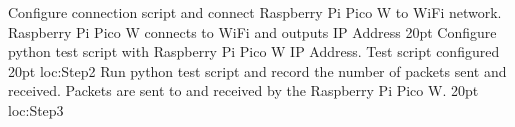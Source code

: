 {%
%
%
%
\tpStep%
{Configure connection script and connect Raspberry Pi Pico W to WiFi network.}
{Raspberry Pi Pico W connects to WiFi and outputs IP Address}
{20pt}
%
\tpStepLabeled%
{Configure python test script with Raspberry Pi Pico W IP Address.}
{Test script configured}
{20pt}
{loc:Step2}
%
\tpStepLabeled%
{Run python test script and record the number of packets sent and received.}
{Packets are sent to and received by the Raspberry Pi Pico W.}
{20pt}
{loc:Step3}
%
%
%
}%


